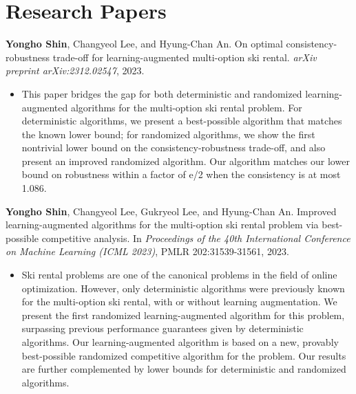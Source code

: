 \documentclass{article}
\newcommand{\killinitspace}{-0.7em}
\begin{document}
\section{Research Papers}
\textbf{Yongho Shin}, Changyeol Lee, and Hyung-Chan An. On optimal consistency-robustness trade-off for learning-augmented multi-option ski rental. \emph{arXiv preprint arXiv:2312.02547}, 2023.
\vspace{\killinitspace}
\begin{itemize}
\item This paper bridges the gap for both deterministic and randomized learning-augmented algorithms for the multi-option ski rental problem. For deterministic algorithms, we present a best-possible algorithm that matches the known lower bound; for randomized algorithms, we show the first nontrivial lower bound on the consistency-robustness trade-off, and also present an improved randomized algorithm. Our algorithm matches our lower bound on robustness within a factor of e/2 when the consistency is at most 1.086.
\end{itemize}

\textbf{Yongho Shin}, Changyeol Lee, Gukryeol Lee, and Hyung-Chan An. Improved learning-augmented algorithms for the multi-option ski rental problem via best-possible competitive analysis. In \emph{Proceedings of the 40th International Conference on Machine Learning (ICML 2023)}, PMLR 202:31539-31561, 2023.
\vspace{\killinitspace}
\begin{itemize}
\item Ski rental problems are one of the canonical problems in the field of online optimization. However, only deterministic algorithms were previously known for the multi-option ski rental, with or without learning augmentation. We present the first randomized learning-augmented algorithm for this problem, surpassing previous performance guarantees given by deterministic algorithms. Our learning-augmented algorithm is based on a new, provably best-possible randomized competitive algorithm for the problem. Our results are further complemented by lower bounds for deterministic and randomized algorithms.
\end{itemize}
\end{document}
